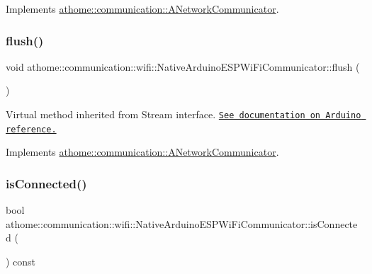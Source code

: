 Implements \mbox{\hyperlink{classathome_1_1communication_1_1_a_network_communicator_a025b7fbe9b3c4452fcf1925d766324eb}{athome\+::communication\+::\+A\+Network\+Communicator}}.

\mbox{\label{classathome_1_1communication_1_1wifi_1_1_native_arduino_e_s_p_wi_fi_communicator_a5b02865d3bf418d1b4dff8a1198c8dac}} 
\subsubsection{\texorpdfstring{flush()}{flush()}}
{\footnotesize\ttfamily void athome\+::communication\+::wifi\+::\+Native\+Arduino\+E\+S\+P\+Wi\+Fi\+Communicator\+::flush (\begin{DoxyParamCaption}{ }\end{DoxyParamCaption})\hspace{0.3cm}{\ttfamily [virtual]}}

Virtual method inherited from Stream interface. \href{https://www.arduino.cc/reference/en/language/functions/communication/stream/streamflush/}{\tt See documentation on Arduino reference.} 

Implements \mbox{\hyperlink{classathome_1_1communication_1_1_a_network_communicator_a5e3b278ad11e6c00ac7d3e2fee3f01b1}{athome\+::communication\+::\+A\+Network\+Communicator}}.

\mbox{\label{classathome_1_1communication_1_1wifi_1_1_native_arduino_e_s_p_wi_fi_communicator_a1ad428f03137d93a142ec5ae72f19e14}} 
\subsubsection{\texorpdfstring{is\+Connected()}{isConnected()}}
{\footnotesize\ttfamily bool athome\+::communication\+::wifi\+::\+Native\+Arduino\+E\+S\+P\+Wi\+Fi\+Communicator\+::is\+Connected (\begin{DoxyParamCaption}{ }\end{DoxyParamCaption}) const\hspace{0.3cm}{\ttfamily [virtual]}}

